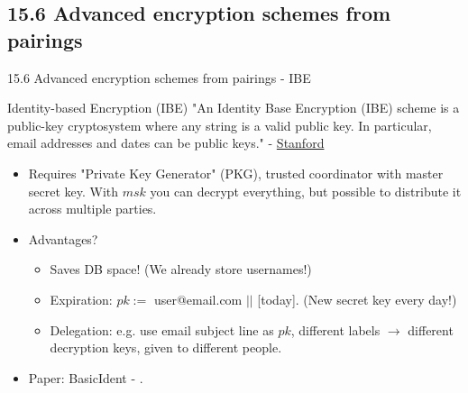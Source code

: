 \documentclass[aspectratio=169,xcolor=dvipsnames]{beamer}
\begin{document}
\subsection{15.6 Advanced encryption schemes from pairings}
\begin{frame}{15.6 Advanced encryption schemes from pairings - IBE}
\begin{block}{Identity-based Encryption (IBE)}
"An Identity Base Encryption (IBE) scheme is a public-key cryptosystem where any string is a valid public key. In particular, email addresses and dates can be public keys." - \href{https://crypto.stanford.edu/ibe/}{Stanford}
\end{block}
\begin{itemize}
    \item Requires "Private Key Generator" (PKG), trusted coordinator with master secret key. With $msk$ you can decrypt everything, but possible to distribute it across multiple parties.
    \item Advantages?
    \begin{itemize}
        \item Saves DB space! (We already store usernames!)
        \item Expiration: $pk := $ user@email.com $||$ [today]. (New secret key every day!)
        \item Delegation: e.g. use email subject line as $pk$, different labels $\rightarrow$ different decryption keys, given to different people.
    \end{itemize}
    \item Paper: BasicIdent - \cite{p2}.
\end{itemize}
\end{frame}
\end{document}

